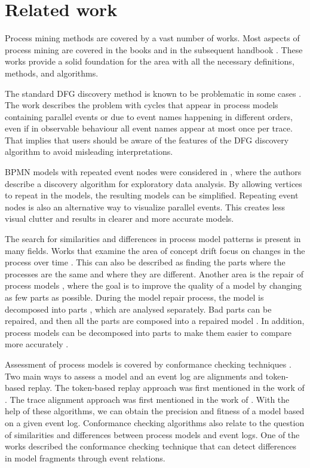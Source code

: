 \section{Related work}
\label{sec:related}

Process mining methods are covered by a vast number of works. 
Most aspects of process mining are covered in the books \citep{Aalst16,Burattin15,MansAV15} and in the subsequent handbook \citep{van2022process}. These works provide a solid foundation for the area with all the necessary definitions, methods, and algorithms.

The standard DFG discovery method is known to be problematic in some cases \citep{Van_der_Aalst2019-sp}. The work describes the problem with cycles that appear in process models containing parallel events or due to event names happening in different orders, even if in observable behaviour all event names appear at most once per trace. That implies that users should be aware of the features of the DFG discovery algorithm to avoid misleading interpretations.

BPMN models with repeated event nodes were considered in \cite{Lieben2018-st}, where the authors describe a discovery algorithm for exploratory data analysis. By allowing vertices to repeat in the models, the resulting models can be simplified. Repeating event nodes is also an alternative way to visualize parallel events. This creates less visual clutter and results in clearer and more accurate models.

The search for similarities and differences in process model patterns is present in many fields. Works that examine the area of concept drift focus on changes in the process over time \citep{Bose2011-hg, Bose2014-by}. This can also be described as finding the parts where the processes are the same and where they are different. Another area is the repair of process models \citep{FahlandA15,MitsyukLA17,PolyvyanyyAHW17}, where the goal is to improve the quality of a model by changing as few parts as possible. During the model repair process, the model is decomposed into parts \citep{Aalst13}, which are analysed separately. 
Bad parts can be repaired, and then all the parts are composed into a repaired model \citep{MitsyukLA17}. 
In addition, process models can be decomposed into parts to make them easier to compare more accurately \citep{BrockhoffGUA24}.

Assessment of process models is covered by conformance checking techniques \citep{CarmonaDSW18,Munoz-Gama16}. Two main ways to assess a model and an event log are alignments and token-based replay. The token-based replay approach was first mentioned in the work of \cite{Rozinat2008-bd}. The trace alignment approach was first mentioned in the work of \cite{Van_der_Aalst2012-kp}. With the help of these algorithms, we can obtain the precision and fitness of a model based on a given event log. Conformance checking algorithms also relate to the question of similarities and differences between process models and event logs. One of the works \citep{Artamonov2019-vq} described the conformance checking technique that can detect differences in model fragments through event relations. 

